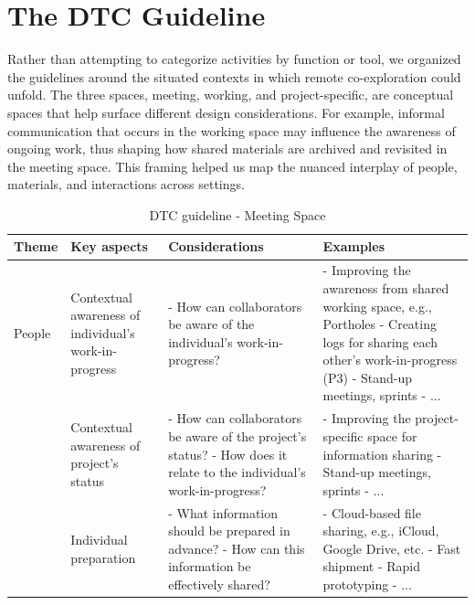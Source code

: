 \documentclass[11pt]{article}
\begin{document}
\section {The DTC Guideline}
Rather than attempting to categorize activities by function or tool, we organized the guidelines around the situated contexts in which remote co-exploration could unfold. The three spaces, meeting, working, and project-specific, are conceptual spaces that help surface different design considerations. For example, informal communication that occurs in the working space may influence the awareness of ongoing work, thus shaping how shared materials are archived and revisited in the meeting space. This framing helped us map the nuanced interplay of people, materials, and interactions across settings. 

\begin{table}[ht]
\centering
\small
\caption{DTC guideline - Meeting Space}
\footnotesize
\begin{tabular}{|l|p{3.2cm}|p{4.5cm}|p{4.5cm}|}
\hline
\textbf{Theme} & \textbf{Key aspects} & \textbf{Considerations} & \textbf{Examples} \\
\hline

People & Contextual awareness of individual's work-in-progress 
& - How can collaborators be aware of the individual’s work-in-progress?
& - Improving the awareness from shared working space, e.g., Portholes\cite{dourish1992portholes} \newline - Creating logs for sharing each other’s work-in-progress (P3) \newline - Stand-up meetings, sprints\cite{stray2016daily} \newline - ... \newline {~}\\


{~} & Contextual awareness of project’s status 
& - How can collaborators be aware of the project’s status? \newline - How does it relate to the individual’s work-in-progress?
& - Improving the project-specific space for information sharing \newline - Stand-up meetings, sprints\cite{stray2016daily} \newline - ... \newline {~}\\


{~} & Individual preparation 
& - What information should be prepared in advance? \newline - How can this information be effectively shared?
& - Cloud-based file sharing, e.g., iCloud, Google Drive, etc. \newline - Fast shipment \newline - Rapid prototyping \newline - ... \newline {~}\\
\hline


\end{tabular}
\end{table}
\end{document}
